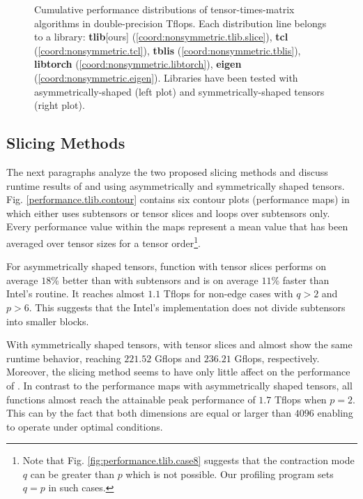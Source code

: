 \begin{figure*}[t]


\caption{ %
\footnotesize%
Cumulative performance distributions of tensor-times-matrix algorithms in double-precision Tflops.
Each distribution line belongs to a library:
\textbf{tlib}[ours] (\ref{coord:nonsymmetric.tlib.slice}), %
\textbf{tcl} (\ref{coord:nonsymmetric.tcl}), %
\textbf{tblis} (\ref{coord:nonsymmetric.tblis}), %
\textbf{libtorch} (\ref{coord:nonsymmetric.libtorch}), %
\textbf{eigen} (\ref{coord:nonsymmetric.eigen}).
Libraries have been tested with asymmetrically-shaped (left plot) and symmetrically-shaped tensors (right plot).
}
\label{fig:performance.comparison}
\end{figure*}


\subsection{Slicing Methods}
The next paragraphs analyze the two proposed slicing methods and  discuss runtime results of  and  using asymmetrically and symmetrically shaped tensors.
Fig. \ref{performance.tlib.contour} contains six contour plots (performance maps) in which  either uses subtensors or tensor slices and  loops over subtensors only.
Every performance value within the maps represent a mean value that has been averaged over tensor sizes for a tensor order\footnote{Note that Fig. \ref{fig:performance.tlib.case8} suggests that the contraction mode $q$ can be greater than $p$ which is not possible.
Our profiling program sets $q=p$ in such cases.}.

For asymmetrically shaped tensors, function  with tensor slices performs on average $18$\% better than with subtensors and is on average $11$\% faster than Intel's  routine.
It reaches almost $1.1$ Tflops for non-edge cases with $q>2$ and $p > 6$.
This suggests that the Intel's implementation does not divide subtensors into smaller blocks.

With symmetrically shaped tensors,  with tensor slices and  almost show the same runtime behavior, reaching $221.52$ Gflops and $236.21$ Gflops, respectively.
Moreover, the slicing method seems to have only little affect on the performance of .
In contrast to the performance maps with asymmetrically shaped tensors, all functions almost reach the attainable peak performance of $1.7$ Tflops when $p=2$.
This can by the fact that both dimensions are equal or larger than $4096$ enabling  to operate under optimal conditions.
\vspace{-1em}

